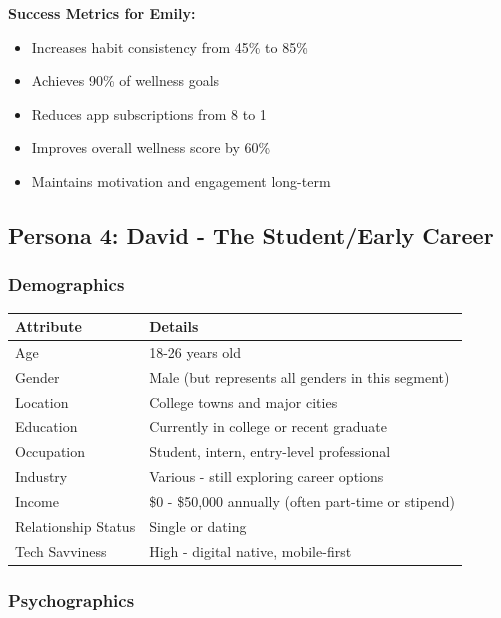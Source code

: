 \textbf{Success Metrics for Emily:}

\begin{itemize}
    \item Increases habit consistency from 45\% to 85\%
    \item Achieves 90\% of wellness goals
    \item Reduces app subscriptions from 8 to 1
    \item Improves overall wellness score by 60\%
    \item Maintains motivation and engagement long-term
\end{itemize}

\subsection{Persona 4: David - The Student/Early Career}

\subsubsection{Demographics}

\begin{table}[H]
\centering
\begin{tabular}{|l|p{10cm}|}
\hline
\rowcolor{lightgray}
\textbf{Attribute} & \textbf{Details} \\
\hline
Age & 18-26 years old \\
\hline
Gender & Male (but represents all genders in this segment) \\
\hline
Location & College towns and major cities \\
\hline
Education & Currently in college or recent graduate \\
\hline
Occupation & Student, intern, entry-level professional \\
\hline
Industry & Various - still exploring career options \\
\hline
Income & \$0 - \$50,000 annually (often part-time or stipend) \\
\hline
Relationship Status & Single or dating \\
\hline
Tech Savviness & High - digital native, mobile-first \\
\hline
\end{tabular}
\end{table}

\subsubsection{Psychographics}

